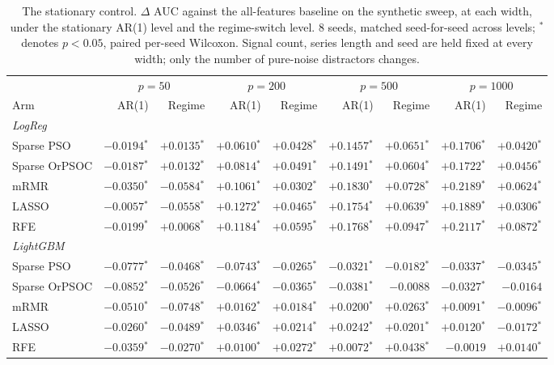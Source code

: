 \begin{table}[htbp]
    \centering
    \small\setlength{\tabcolsep}{5pt}
    \begin{tabular}{lrrrrrrrr}
    \hline
    & \multicolumn{2}{c}{$p = 50$} & \multicolumn{2}{c}{$p = 200$} & \multicolumn{2}{c}{$p = 500$} & \multicolumn{2}{c}{$p = 1000$} \\
    Arm & AR(1) & Regime & AR(1) & Regime & AR(1) & Regime & AR(1) & Regime \\
    \hline
    \multicolumn{9}{l}{\textit{LogReg}} \\
    Sparse PSO & $-0.0194$$^{*}$ & $+0.0135$$^{*}$ & $+0.0610$$^{*}$ & $+0.0428$$^{*}$ & $+0.1457$$^{*}$ & $+0.0651$$^{*}$ & $+0.1706$$^{*}$ & $+0.0420$$^{*}$ \\
    Sparse OrPSOC & $-0.0187$$^{*}$ & $+0.0132$$^{*}$ & $+0.0814$$^{*}$ & $+0.0491$$^{*}$ & $+0.1491$$^{*}$ & $+0.0604$$^{*}$ & $+0.1722$$^{*}$ & $+0.0456$$^{*}$ \\
    mRMR & $-0.0350$$^{*}$ & $-0.0584$$^{*}$ & $+0.1061$$^{*}$ & $+0.0302$$^{*}$ & $+0.1830$$^{*}$ & $+0.0728$$^{*}$ & $+0.2189$$^{*}$ & $+0.0624$$^{*}$ \\
    LASSO & $-0.0057$$^{*}$ & $-0.0558$$^{*}$ & $+0.1272$$^{*}$ & $+0.0465$$^{*}$ & $+0.1754$$^{*}$ & $+0.0639$$^{*}$ & $+0.1889$$^{*}$ & $+0.0306$$^{*}$ \\
    RFE & $-0.0199$$^{*}$ & $+0.0068$$^{*}$ & $+0.1184$$^{*}$ & $+0.0595$$^{*}$ & $+0.1768$$^{*}$ & $+0.0947$$^{*}$ & $+0.2117$$^{*}$ & $+0.0872$$^{*}$ \\
    \hline
    \multicolumn{9}{l}{\textit{LightGBM}} \\
    Sparse PSO & $-0.0777$$^{*}$ & $-0.0468$$^{*}$ & $-0.0743$$^{*}$ & $-0.0265$$^{*}$ & $-0.0321$$^{*}$ & $-0.0182$$^{*}$ & $-0.0337$$^{*}$ & $-0.0345$$^{*}$ \\
    Sparse OrPSOC & $-0.0852$$^{*}$ & $-0.0526$$^{*}$ & $-0.0664$$^{*}$ & $-0.0365$$^{*}$ & $-0.0381$$^{*}$ & $-0.0088$ & $-0.0327$$^{*}$ & $-0.0164$ \\
    mRMR & $-0.0510$$^{*}$ & $-0.0748$$^{*}$ & $+0.0162$$^{*}$ & $+0.0184$$^{*}$ & $+0.0200$$^{*}$ & $+0.0263$$^{*}$ & $+0.0091$$^{*}$ & $-0.0096$$^{*}$ \\
    LASSO & $-0.0260$$^{*}$ & $-0.0489$$^{*}$ & $+0.0346$$^{*}$ & $+0.0214$$^{*}$ & $+0.0242$$^{*}$ & $+0.0201$$^{*}$ & $+0.0120$$^{*}$ & $-0.0172$$^{*}$ \\
    RFE & $-0.0359$$^{*}$ & $-0.0270$$^{*}$ & $+0.0100$$^{*}$ & $+0.0272$$^{*}$ & $+0.0072$$^{*}$ & $+0.0438$$^{*}$ & $-0.0019$ & $+0.0140$$^{*}$ \\
    \hline
    \end{tabular}
    \caption{The stationary control. $\Delta$ AUC against the all-features baseline on the synthetic sweep, at each width, under the stationary AR(1) level and the regime-switch level. 8 seeds, matched seed-for-seed across levels; $^{*}$ denotes $p < 0.05$, paired per-seed Wilcoxon. Signal count, series length and seed are held fixed at every width; only the number of pure-noise distractors changes.}
    \label{tab:ar1control}
\end{table}
